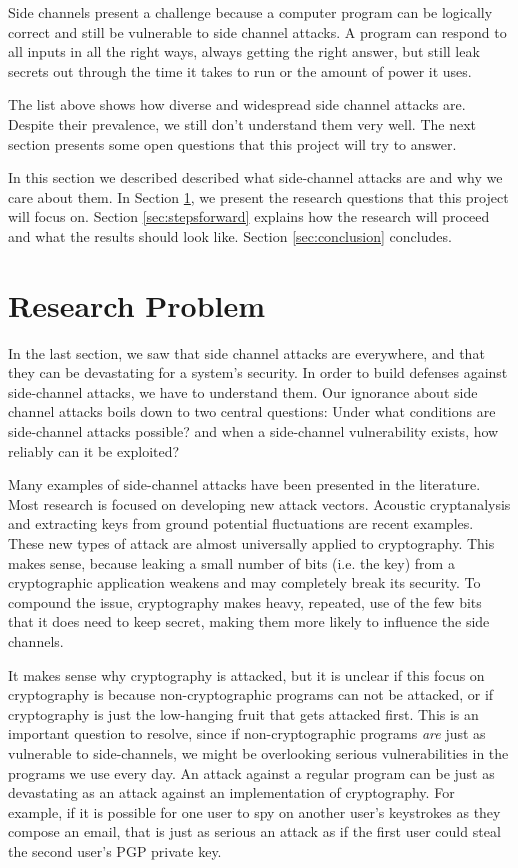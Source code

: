 \documentclass{acm_proc_article-sp}
\begin{document}
Side channels present a challenge because a computer program can be logically
correct and still be vulnerable to side channel attacks. A program can respond
to all inputs in all the right ways, always getting the right answer, but still
leak secrets out through the time it takes to run or the amount of power it
uses.

The list above shows how diverse and widespread side channel attacks are.
Despite their prevalence, we still don't understand them very well. The next
section presents some open questions that this project will try to answer.

In this section we described described what side-channel attacks are and why we
care about them. In Section \ref{sec:problem}, we present the research questions
that this project will focus on. Section \ref{sec:stepsforward} explains how the
research will proceed and what the results should look like. Section
\ref{sec:conclusion} concludes.

\section{Research Problem}
\label{sec:problem}

In the last section, we saw that side channel attacks are everywhere, and that
they can be devastating for a system's security. In order to build defenses
against side-channel attacks, we have to understand them. Our ignorance about
side channel attacks boils down to two central questions: Under what conditions
are side-channel attacks possible? and when a side-channel vulnerability exists,
how reliably can it be exploited?

Many examples of side-channel attacks have been presented in the literature.
Most research is focused on developing new attack vectors. Acoustic
cryptanalysis \cite{genkin2013rsa} and extracting keys from ground potential
fluctuations \cite{genkin2014get} are recent examples. These new types of attack
are almost universally applied to cryptography. This makes sense, because
leaking a small number of bits (i.e. the key) from a cryptographic application
weakens and may completely break its security. To compound the issue,
cryptography makes heavy, repeated, use of the few bits that it does need to
keep secret, making them more likely to influence the side channels.

It makes sense why cryptography is attacked, but it is unclear if this focus on
cryptography is because non-cryptographic programs can not be attacked, or if
cryptography is just the low-hanging fruit that gets attacked first. This is an
important question to resolve, since if non-cryptographic programs \emph{are}
just as vulnerable to side-channels, we might be overlooking serious
vulnerabilities in the programs we use every day. An attack against a regular
program can be just as devastating as an attack against an implementation of
cryptography. For example, if it is possible for one user to spy on another
user's keystrokes as they compose an email, that is just as serious an attack as
if the first user could steal the second user's PGP private key.
\end{document}
